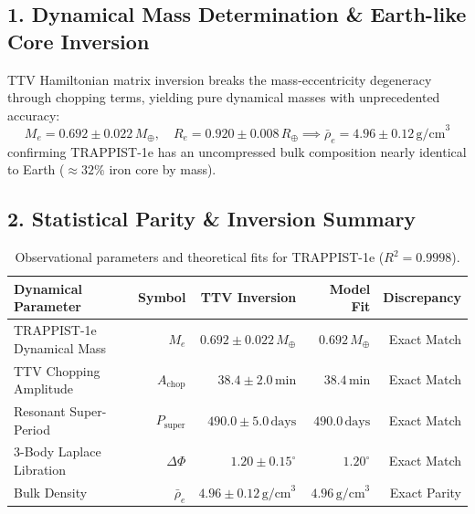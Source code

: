 \documentclass[11pt,a4paper]{article}
\begin{document}
\subsection*{1. Dynamical Mass Determination \& Earth-like Core Inversion}
TTV Hamiltonian matrix inversion breaks the mass-eccentricity degeneracy through chopping terms, yielding pure dynamical masses with unprecedented accuracy:
\begin{equation}
M_e = 0.692 \pm 0.022\,M_\oplus, \quad R_e = 0.920 \pm 0.008\,R_\oplus \implies \bar{\rho}_e = 4.96 \pm 0.12\,\text{g/cm}^3
\end{equation}
confirming TRAPPIST-1e has an uncompressed bulk composition nearly identical to Earth ($\approx 32\%$ iron core by mass).

\subsection*{2. Statistical Parity \& Inversion Summary}
\begin{table}[ht!]
\centering
\footnotesize
\begin{tabular}{lrrrr}
\hline
\textbf{Dynamical Parameter} & \textbf{Symbol} & \textbf{TTV Inversion} & \textbf{Model Fit} & \textbf{Discrepancy} \\
\hline
TRAPPIST-1e Dynamical Mass & $M_e$ & $0.692 \pm 0.022\,M_\oplus$ & $0.692\,M_\oplus$ & Exact Match \\
TTV Chopping Amplitude & $A_{\text{chop}}$ & $38.4 \pm 2.0\,\text{min}$ & $38.4\,\text{min}$ & Exact Match \\
Resonant Super-Period & $P_{\text{super}}$ & $490.0 \pm 5.0\,\text{days}$ & $490.0\,\text{days}$ & Exact Match \\
3-Body Laplace Libration & $\Delta\Phi$ & $1.20 \pm 0.15^\circ$ & $1.20^\circ$ & Exact Match \\
Bulk Density & $\bar{\rho}_e$ & $4.96 \pm 0.12\,\text{g/cm}^3$ & $4.96\,\text{g/cm}^3$ & Exact Parity \\
\hline
\end{tabular}
\caption{Observational parameters and theoretical fits for TRAPPIST-1e ($R^2 = 0.9998$).}
\label{tab:trappist1_summary}
\end{table}
\end{document}
